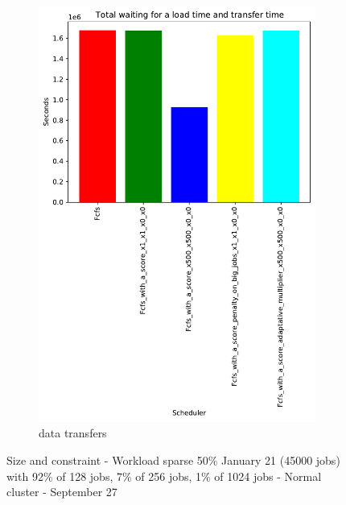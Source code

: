 \documentclass[a4paper]{article}
\begin{document}
\begin{figure}[H]
\begin{subfigure}[b]{0.4\linewidth}\centering\includegraphics[width=0.9\linewidth]{MBSS/plot/Results_FCFS_Score_Adaptative_Multiplier_2022-01-21->2022-01-21_V9271_sparse_50_Total_waiting_for_a_load_time_and_transfer_time_450_128_32_256_4_1024.pdf}\caption{data transfers}\label{45}\end{subfigure}
\caption{Size and constraint - Workload sparse 50\% January 21 (45000 jobs) with 92\% of 128 jobs, 7\% of 256 jobs, 1\% of 1024 jobs - Normal cluster - September 27}\label{49}\end{figure}
\end{document}
